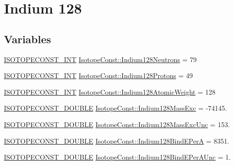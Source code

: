 \hypertarget{group___isotope_const-_indium-_in128}{}\section{Indium 128}
\label{group___isotope_const-_indium-_in128}
\subsection*{Variables}
\begin{DoxyCompactItemize}
\item 
\mbox{\hyperlink{group___isotope_const-_macros_ga5f18360b3e99483a35c32d789e62621c}{I\+S\+O\+T\+O\+P\+E\+C\+O\+N\+S\+T\+\_\+\+I\+NT}} \mbox{\hyperlink{group___isotope_const-_indium-_in128_gab10b8530797430ca64f8512879e509e9}{Isotope\+Const\+::\+Indium128\+Neutrons}} = 79
\item 
\mbox{\hyperlink{group___isotope_const-_macros_ga5f18360b3e99483a35c32d789e62621c}{I\+S\+O\+T\+O\+P\+E\+C\+O\+N\+S\+T\+\_\+\+I\+NT}} \mbox{\hyperlink{group___isotope_const-_indium-_in128_gaaf334c1ac460f71121b3ed0d43c2f27c}{Isotope\+Const\+::\+Indium128\+Protons}} = 49
\item 
\mbox{\hyperlink{group___isotope_const-_macros_ga5f18360b3e99483a35c32d789e62621c}{I\+S\+O\+T\+O\+P\+E\+C\+O\+N\+S\+T\+\_\+\+I\+NT}} \mbox{\hyperlink{group___isotope_const-_indium-_in128_ga597df5fc0c1bac9833d9a822af231994}{Isotope\+Const\+::\+Indium128\+Atomic\+Weight}} = 128
\item 
\mbox{\hyperlink{group___isotope_const-_macros_ga8f45a7272ce02c0b4c65c44636ed719a}{I\+S\+O\+T\+O\+P\+E\+C\+O\+N\+S\+T\+\_\+\+D\+O\+U\+B\+LE}} \mbox{\hyperlink{group___isotope_const-_indium-_in128_gaa7e4ae72231b87d912077b84f55137fe}{Isotope\+Const\+::\+Indium128\+Mass\+Exc}} = -\/74145.
\item 
\mbox{\hyperlink{group___isotope_const-_macros_ga8f45a7272ce02c0b4c65c44636ed719a}{I\+S\+O\+T\+O\+P\+E\+C\+O\+N\+S\+T\+\_\+\+D\+O\+U\+B\+LE}} \mbox{\hyperlink{group___isotope_const-_indium-_in128_gac243aeaf22796e49c28d19ea9b04fc0d}{Isotope\+Const\+::\+Indium128\+Mass\+Exc\+Unc}} = 153.
\item 
\mbox{\hyperlink{group___isotope_const-_macros_ga8f45a7272ce02c0b4c65c44636ed719a}{I\+S\+O\+T\+O\+P\+E\+C\+O\+N\+S\+T\+\_\+\+D\+O\+U\+B\+LE}} \mbox{\hyperlink{group___isotope_const-_indium-_in128_ga86788e5e16f9a08d29a2854cb1b7d177}{Isotope\+Const\+::\+Indium128\+Bind\+E\+PerA}} = 8351.
\item 
\mbox{\hyperlink{group___isotope_const-_macros_ga8f45a7272ce02c0b4c65c44636ed719a}{I\+S\+O\+T\+O\+P\+E\+C\+O\+N\+S\+T\+\_\+\+D\+O\+U\+B\+LE}} \mbox{\hyperlink{group___isotope_const-_indium-_in128_gac5a9e32dff4202157f9d202041860099}{Isotope\+Const\+::\+Indium128\+Bind\+E\+Per\+A\+Unc}} = 1.

\end{DoxyCompactItemize}
